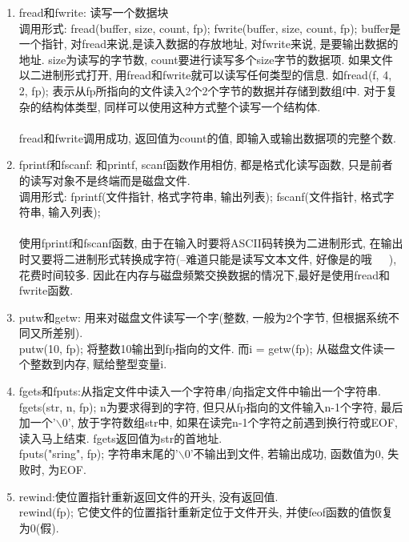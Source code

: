 \documentclass[a4paper,10pt,english]{article}
\begin{document}
\begin {enumerate}
\item {fread和fwrite}: 读写一个数据块  \\
调用形式: fread(buffer, size, count, fp); fwrite(buffer, size, count, fp); buffer是一个指针, 对fread来说,是读入数据的存放地址, 对fwrite来说, 是要输出数据的地址. size为读写的字节数, count要进行读写多个size字节的数据项. 如果文件以二进制形式打开, 用fread和fwrite就可以读写任何类型的信息. 如fread(f, 4, 2, fp); 表示从fp所指向的文件读入2个2个字节的数据并存储到数组f中. 对于复杂的结构体类型, 同样可以使用这种方式整个读写一个结构体.\\\\
fread和fwrite调用成功, 返回值为count的值, 即输入或输出数据项的完整个数.
\item {fprintf和fscanf}: 和printf, scanf函数作用相仿, 都是格式化读写函数, 只是前者的读写对象不是终端而是磁盘文件. \\
调用形式: fprintf(文件指针, 格式字符串, 输出列表); fscanf(文件指针, 格式字符串, 输入列表); \\\\
使用fprintf和fscanf函数, 由于在输入时要将ASCII码转换为二进制形式, 在输出时又要将二进制形式转换成字符(--难道只能是读写文本文件, 好像是的哦~~~), 花费时间较多. 因此在内存与磁盘频繁交换数据的情况下,最好是使用fread和fwrite函数.\\

\item {putw和getw}: 用来对磁盘文件读写一个字(整数, 一般为2个字节, 但根据系统不同又所差别). \\
putw(10, fp); 将整数10输出到fp指向的文件. 而i = getw(fp); 从磁盘文件读一个整数到内存, 赋给整型变量i.

\item {fgets和fputs}:从指定文件中读入一个字符串/向指定文件中输出一个字符串.\\
fgets(str, n, fp); n为要求得到的字符, 但只从fp指向的文件输入n-1个字符, 最后加一个'$\backslash 0$', 放于字符数组str中, 如果在读完n-1个字符之前遇到换行符或EOF, 读入马上结束. fgets返回值为str的首地址.\\
fputs("sring", fp); 字符串末尾的'$\backslash 0$'不输出到文件, 若输出成功, 函数值为0, 失败时, 为EOF.

\item {rewind}:使位置指针重新返回文件的开头, 没有返回值. \\
rewind(fp); 它使文件的位置指针重新定位于文件开头, 并使feof函数的值恢复为0(假).


\end{enumerate}
\end{document}
